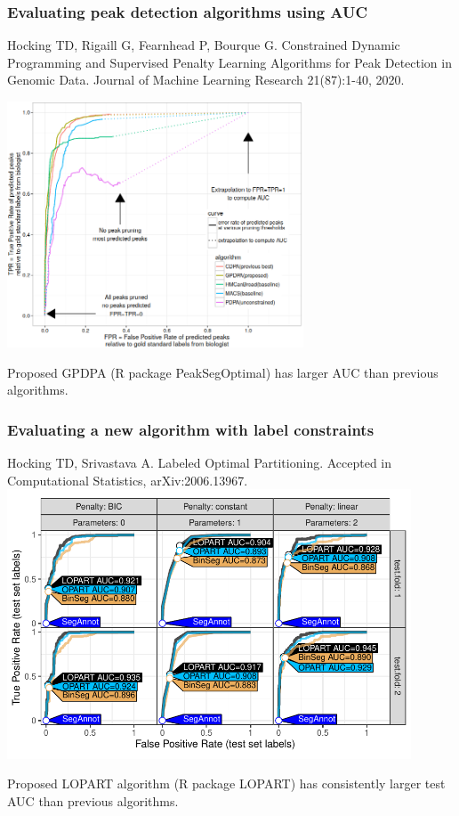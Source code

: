 \documentclass[t]{beamer}
\begin{document}
\begin{frame}
  \frametitle{Evaluating peak detection algorithms using AUC}
{\scriptsize Hocking TD, Rigaill G, Fearnhead P, Bourque G. Constrained Dynamic Programming and Supervised Penalty Learning Algorithms for Peak Detection in Genomic Data. Journal of Machine Learning Research 21(87):1-40, 2020.}

\includegraphics[width=0.66\textwidth]{figure-Hocking2020-roc}

  Proposed GPDPA (R package PeakSegOptimal) has larger AUC than
  previous algorithms.

\end{frame}

\begin{frame}
  \frametitle{Evaluating a new algorithm with label constraints}
  {\scriptsize Hocking TD, Srivastava A. Labeled Optimal Partitioning. Accepted in Computational Statistics, arXiv:2006.13967.}
  \includegraphics[width=0.9\textwidth]{figure-LOPART-roc}

  Proposed LOPART algorithm (R package LOPART) has consistently larger
  test AUC than previous algorithms.
\end{frame}
\end{document}
